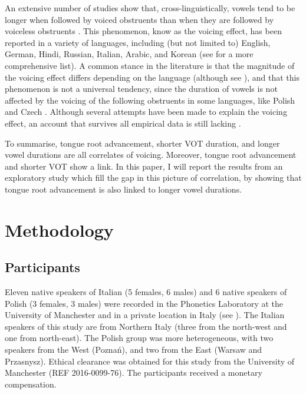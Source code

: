 \documentclass[]{article}
\begin{document}
An extensive number of studies show that, cross-linguistically, vowels
tend to be longer when followed by voiced obstruents than when they are
followed by voiceless obstruents
\citep{house1953, peterson1960, chen1970, klatt1973, lisker1974, farnetani1986, fowler1992, hussein1994, esposito2002, lampp2004, durvasula2012}.
This phenomenon, know as the voicing effect, has been reported in a
variety of languages, including (but not limited to) English, German,
Hindi, Russian, Italian, Arabic, and Korean (see \citealt{maddieson1976}
for a more comprehensive list). A common stance in the literature is
that the magnitude of the voicing effect differs depending on the
language (although see \citealt{laeufer1992} ), and that this phenomenon
is not a universal tendency, since the duration of vowels is not
affected by the voicing of the following obstruents in some languages,
like Polish and Czech \citep{keating1984}. Although several attempts
have been made to explain the voicing effect, an account that survives
all empirical data is still lacking \citep{durvasula2012,soskuthy2013}.

To summarise, tongue root advancement, shorter VOT duration, and longer
vowel durations are all correlates of voicing. Moreover, tongue root
advancement and shorter VOT show a link. In this paper, I will report
the results from an exploratory study which fill the gap in this picture
of correlation, by showing that tongue root advancement is also linked
to longer vowel durations.

\hypertarget{methodology}{%
\section{Methodology}\label{methodology}}

\hypertarget{participants}{%
\subsection{Participants}\label{participants}}

Eleven native speakers of Italian (5 females, 6 males) and 6 native
speakers of Polish (3 females, 3 males) were recorded in the Phonetics
Laboratory at the University of Manchester and in a private location in
Italy (see ). The Italian speakers of this study
are from Northern Italy (three from the north-west and one from
north-east). The Polish group was more heterogeneous, with two speakers
from the West (Poznań), and two from the East (Warsaw and Przasnysz).
Ethical clearance was obtained for this study from the University of
Manchester (REF 2016-0099-76). The participants received a monetary
compensation.
\end{document}

